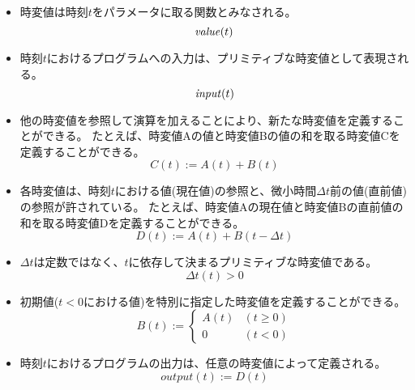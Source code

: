 \begin{itemize}
  \item
  時変値は時刻$t$をパラメータに取る関数とみなされる。
  \begin{equation*}
    {\it value}(t)
  \end{equation*}

  \item
  時刻$t$におけるプログラムへの入力は、プリミティブな時変値として表現される。
  \begin{equation*}
    {\it input}(t)
  \end{equation*}

  \item
  他の時変値を参照して演算を加えることにより、新たな時変値を定義することができる。
  たとえば、時変値Aの値と時変値Bの値の和を取る時変値Cを定義することができる。
  \begin{equation*}
    C(t) := A(t) + B(t)
  \end{equation*}

  \item
  各時変値は、時刻$t$における値(現在値)の参照と、微小時間$ \Delta t $前の値(直前値)の参照が許されている。
  たとえば、時変値Aの現在値と時変値Bの直前値の和を取る時変値Dを定義することができる。
  \begin{equation*}
    D(t) := A(t) + B(t - \Delta t)
  \end{equation*}

  \item
  $ \Delta t $は定数ではなく、$t$に依存して決まるプリミティブな時変値である。
  \begin{equation*}
    \Delta t(t) > 0
  \end{equation*}

  \item
  初期値($ t < 0 $における値)を特別に指定した時変値を定義することができる。
  \begin{equation*}
    B(t) := \begin{cases}
      A(t) & (t \geq 0) \\
      0 & (t < 0)
    \end{cases}
  \end{equation*}

  \item
  時刻$t$におけるプログラムの出力は、任意の時変値によって定義される。
  \begin{equation*}
    output(t) := D(t)
  \end{equation*}
\end{itemize}

